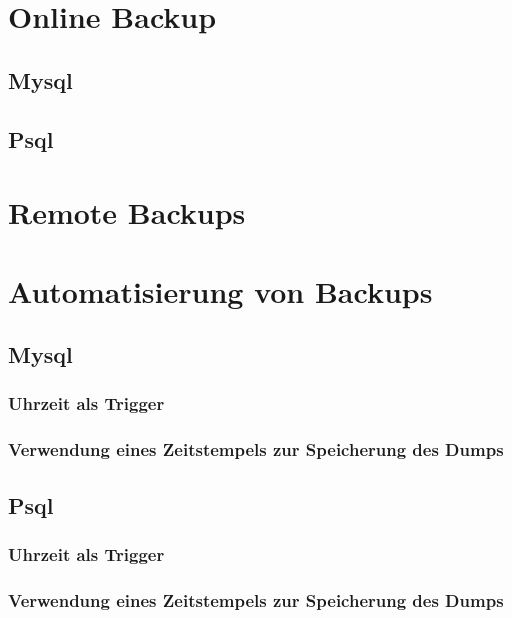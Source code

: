 \documentclass[10pt]{article}
\begin{document}
\section{Online Backup}
\subsection{Mysql}
\subsection{Psql}

\section{Remote Backups}

\section{Automatisierung von Backups}
\subsection{Mysql}
\subsubsection{Uhrzeit als Trigger}
\subsubsection{Verwendung eines Zeitstempels zur Speicherung des Dumps}
\subsection{Psql}
\subsubsection{Uhrzeit als Trigger}
\subsubsection{Verwendung eines Zeitstempels zur Speicherung des Dumps}
\end{document}
